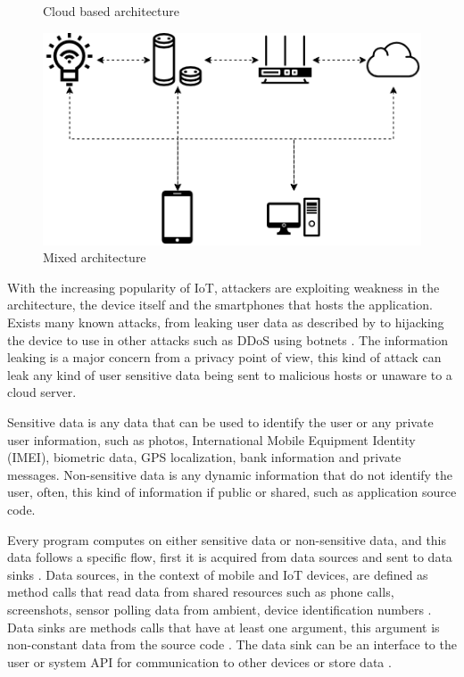 \begin{figure}[ht]
\begin{minipage}[b]{0.5\linewidth}
        \caption{Cloud based architecture}\label{fig:arch-cloud}
        \vspace{4ex}
    \end{minipage}%
    \begin{minipage}[b]{0.5\linewidth}
        \centering
        \includegraphics[width=1\linewidth]{images/iot-architectures/mixed.png}
        \caption{Mixed architecture}\label{fig:arch-mixed}
        \vspace{4ex}
    \end{minipage} 
\end{figure}

With the increasing popularity of IoT, attackers are exploiting weakness in the architecture, the device itself and the smartphones that hosts the application. Exists many known attacks, from leaking user data as described by \cite{ycraig} to hijacking the device to use in other attacks such as DDoS using botnets \citep{kolias2017ddos}. The information leaking is a major concern from a privacy point of view, this kind of attack can leak any kind of user sensitive data being sent to malicious hosts or unaware to a cloud server. 

Sensitive data is any data that can be used to identify the user or any private user information, such as photos, International Mobile Equipment Identity (IMEI), biometric data, GPS localization, bank information and private messages. Non-sensitive data is any dynamic information that do not identify the user, often, this kind of information if public or shared, such as application source code.

Every program computes on either sensitive data or non-sensitive data, and this data follows a specific flow, first it is acquired from data sources and sent to data sinks \citep{mccabe2003network}. Data sources, in the context of mobile and IoT devices, are defined as method calls that read data from shared resources such as phone calls, screenshots, sensor polling data from ambient, device identification numbers \citep{rasthofer2014machine}. Data sinks are methods calls that have at least one argument, this argument is non-constant data from the source code \citep{rasthofer2014machine}. The data sink can be an interface to the user or system API for communication to other devices or store data \citep{viet2010specifying}.

